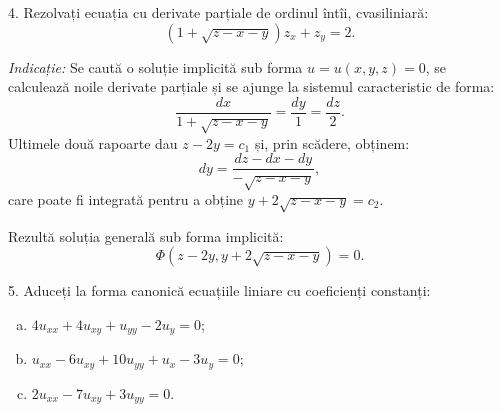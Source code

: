 \vspace{1cm}

4. Rezolvați ecuația cu derivate parțiale de ordinul întîi, cvasiliniară:
\[
    (1 + \sqrt{z - x - y})z_x + z_y = 2.
\]

\emph{Indicație:} Se caută o soluție implicită sub forma $ u = u(x, y, z) = 0 $, se calculează
noile derivate parțiale și se ajunge la sistemul caracteristic de forma:
\[
    \dfrac{dx}{1 + \sqrt{z - x - y}} = \dfrac{dy}{1} = \dfrac{dz}{2}.
\]
Ultimele două rapoarte dau $ z - 2y = c_1 $ și, prin scădere, obținem:
\[
    dy = \dfrac{dz - dx - dy}{-\sqrt{z - x - y}},
\]
care poate fi integrată pentru a obține $ y + 2 \sqrt{z - x - y} = c_2 $.

Rezultă soluția generală sub forma implicită:
\[
    \Phi(z - 2y, y + 2 \sqrt{z - x - y}) = 0.
\]

\vspace{1cm}

5. Aduceți la forma canonică ecuațiile liniare cu coeficienți constanți:
\begin{enumerate}[(a)]
    \item $ 4u_{xx} + 4u_{xy} + u_{yy} - 2u_y = 0 $;
    \item $ u_{xx} - 6u_{xy} + 10u_{yy} + u_x - 3u_y = 0 $;
    \item $ 2u_{xx} - 7u_{xy} + 3u_{yy} = 0 $.
\end{enumerate}

